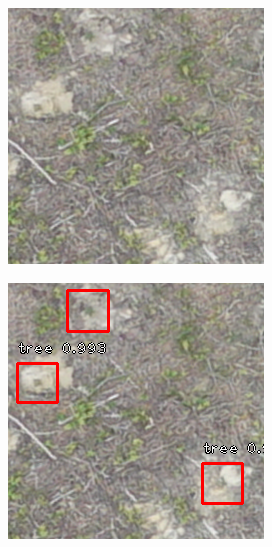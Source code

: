 \documentclass[a4paper, 12pt]{report}
\begin{document}
\begin{figure}[!h]
    \centering
    \begin{subfigure}[!h]{0.45\textwidth}
    \includegraphics[width=\linewidth]{Images/Img_RSKA003603_0_r2560_c3200_2}
        \label{fig:subfig1}
    \end{subfigure}%
    \quad
    \begin{subfigure}[!h]{0.45\textwidth}
    \includegraphics[width=\linewidth]{Images/Img_RSKA003603_0_r2560_c3200}
        \label{fig:subfig2}
    \end{subfigure}
\end{figure}
\end{document}
